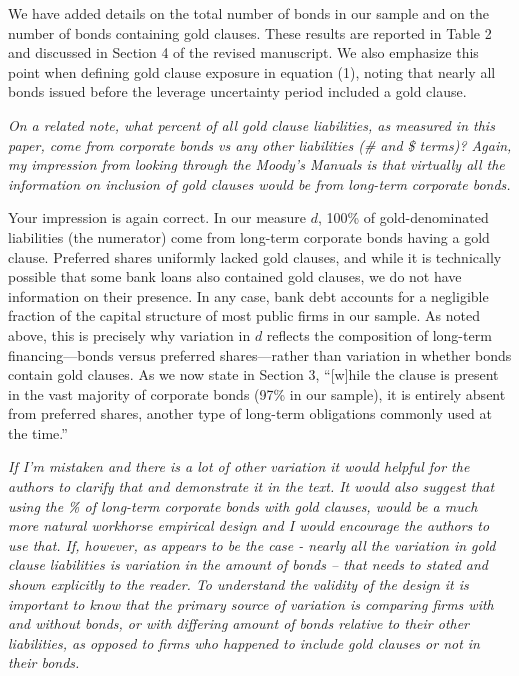 We have added details on the total number of bonds in our sample and on the number of bonds containing gold clauses. These results are reported in Table 2 and discussed in Section 4 of the revised manuscript. We also emphasize this point when defining gold clause exposure in equation (1), noting that nearly all bonds issued before the leverage uncertainty period included a gold clause.

\bigskip

\noindent \textit{\textcolor{red!60!black}{
On a related note, what percent of all gold clause liabilities, as measured in this paper, come from corporate bonds vs any other liabilities (\# and \$ terms)? Again, my impression from looking through the Moody's Manuals is that virtually all the information on inclusion of gold clauses would be from long-term corporate bonds.
}}

\bigskip

\noindent Your impression is again correct. In our measure $d$, 100\% of gold-denominated liabilities (the numerator) come from long-term corporate bonds having a gold clause. Preferred shares uniformly lacked gold clauses, and while it is technically possible that some bank loans also contained gold clauses, we do not have information on their presence. In any case, bank debt accounts for a negligible fraction of the capital structure of most public firms in our sample. As noted above, this is precisely why variation in $d$ reflects the composition of long-term financing---bonds versus preferred shares---rather than variation in whether bonds contain gold clauses. As we now state in Section 3, ``[w]hile the clause is present in the vast majority of corporate bonds (97\% in our sample), it is entirely absent from preferred shares, another type of long-term obligations commonly used at the time.''


\bigskip

\noindent \textit{\textcolor{red!60!black}{
If I'm mistaken and there is a lot of other variation it would helpful for the authors to clarify that and demonstrate it in the text. It would also suggest that using the \% of long-term corporate bonds with gold clauses, would be a much more natural workhorse empirical design and I would encourage the authors to use that. If, however, as appears to be the case - nearly all the variation in gold clause liabilities is variation in the amount of bonds – that needs to stated and shown explicitly to the reader. To understand the validity of the design it is important to know that the primary source of variation is comparing firms with and without bonds, or with differing amount of bonds relative to their other liabilities, as opposed to firms who happened to include gold clauses or not in their bonds.
}}

